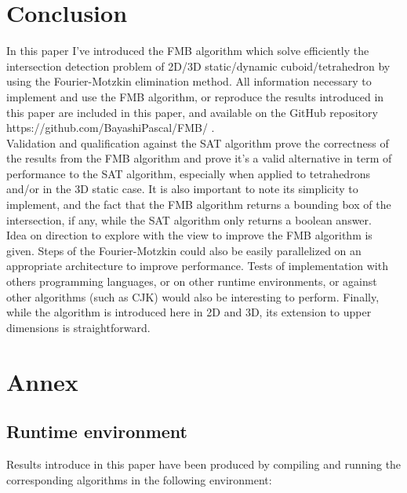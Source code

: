 \documentclass[12pt, a4paper]{article}
\begin{document}
\section{Conclusion}

In this paper I've introduced the FMB algorithm which solve efficiently the intersection detection problem of 2D/3D static/dynamic cuboid/tetrahedron by using the Fourier-Motzkin elimination method. All information necessary to implement and use the FMB algorithm, or reproduce the results introduced in this paper are included in this paper, and available on the GitHub repository https://github.com/BayashiPascal/FMB/ .\\

Validation and qualification against the SAT algorithm prove the correctness of the results from the FMB algorithm and prove it's a valid alternative in term of performance to the SAT algorithm, especially when applied to tetrahedrons and/or in the 3D static case. It is also important to note its simplicity to implement, and the fact that the FMB algorithm returns a bounding box of the intersection, if any, while the SAT algorithm only returns a boolean answer.\\

Idea on direction to explore with the view to improve the FMB algorithm is given. Steps of the Fourier-Motzkin could also be easily parallelized on an appropriate architecture to improve performance. Tests of implementation with others programming languages, or on other runtime environments, or against other algorithms (such as CJK) would also be interesting to perform. Finally, while the algorithm is introduced here in 2D and 3D, its extension to upper dimensions is straightforward.\\

\section{Annex}

\subsection{Runtime environment}
\label{runtime_environment}

Results introduce in this paper have been produced by compiling and running the corresponding algorithms in the following environment:\\

\begin{scriptsize}
\begin{ttfamily}

\end{ttfamily}
\end{scriptsize}
\end{document}
